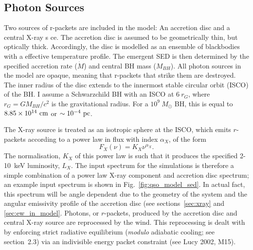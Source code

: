 \subsection{Photon Sources}
\label{sec:photon_sources}

Two sources of r-packets are included in the model:
An accretion disc and a central X-ray s ce.
The accretion disc is assumed to be geometrically thin, 
but optically thick.
Accordingly, the disc is modelled as an ensemble of blackbodies with a 
\cite{shakurasunyaev1973} effective temperature profile. 
The emergent SED is then determined by the specified accretion rate ($\dot{M}$)
and central BH mass ($M_{BH}$).
All photon sources in the model are opaque, meaning
that r-packets that strike them are destroyed.
The inner radius of the disc extends to the innermost 
stable circular orbit (ISCO) of the BH. 
I assume a Schwarzchild BH with an ISCO at $6~r_G$, where 
$r_G = GM_{BH}/c^2$ is the gravitational radius.
For a $10^9~M_\odot$ BH, this is equal to $8.85\times10^{14}~{\rm cm}$ 
or $\sim10^{-4}~{\rm pc}$.  


The X-ray source is treated as an isotropic sphere at the ISCO,
which emits $r$-packets according to a power law in flux with index $\alpha_X$, of the form
\begin{equation}
F_X (\nu) = K_X \nu^{\alpha_X}.
\end{equation}
The normalisation, $K_X$ of this power law is such that it 
produces the specified 2-10~keV luminosity, $L_X$.
The input spectrum for the simulations is therefore a simple combination
of a power law X-ray component and accretion disc spectrum; an example input
spectrum is shown in Fig.~\ref{fig:qso_model_sed}. In actual fact, this
spectrum will be angle dependent due to the geometry of the system and 
the angular emissivity profile of the accretion disc (see sections~\ref{sec:xray}
and \ref{sec:ew_in_model}.
Photons, or $r$-packets, produced by the accretion disc and central X-ray source
are reprocessed by the wind. This reprocessing is dealt with by enforcing strict
radiative equilibrium ({\em modulo} adiabatic cooling; see section~2.3)
via an indivisible energy packet constraint (see Lucy 2002, M15).  

